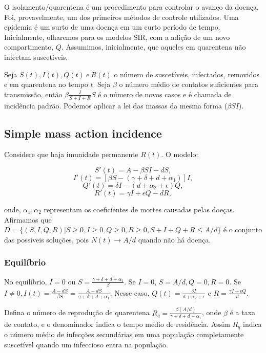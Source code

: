 O isolamento/quarentena é um procedimento para controlar o avanço da doença.
Foi, provavelmente, um dos primeiros métodos de controle utilizados. Uma
epidemia é um surto de uma doença em um curto período de tempo. Inicialmente,
olharemos para os modelos SIR, com a adição de um novo compartimento, $Q$.
Assumimos, inicialmente, que aqueles em quarentena não infectam suscetíveis. 

Seja $S(t), I(t), Q(t) ~e~ R(t) $ o número de suscetíveis, infectados,
removidos e em quarentena no tempo $t$. Seja $\beta$ o número médio de
contatos suficientes para transmissão,  então $\beta\frac{I}{S + I + R}S$ é o
número de novos casos e é chamada de incidência padrão. Podemos aplicar a
lei das massas da mesma forma ($\beta SI$). 

\subsection{Simple mass action incidence}

Considere que haja imunidade permanente $R(t)$. O modelo: 

$$ S'(t) = A - \beta SI - dS,$$
$$ I'(t) = [\beta S - (\gamma + \delta + d + \alpha_1)]I,$$
$$ Q'(t) = \delta I - (d + \alpha_2 + \epsilon)Q,$$
$$ R'(t) = \gamma I + \epsilon Q - dR, $$

onde, $\alpha_1, \alpha_2$ representam os coeficientes de mortes causadas
pelas doeças. Afirmamos que $D = \{(S,I,Q,R) | S \geq 0, I \geq 0, Q \geq 0, R
\geq 0, S + I + Q + R \leq A/d\}$ é o conjunto das possíveis soluções, pois
$N(t) \to A/d$ quando não há doença. 

\subsubsection{Equilíbrio}

No equilíbrio, $I = 0$ ou $S = \frac{\gamma + \delta + d + \alpha_1}{\beta}$.
Se $I = 0$, $S = A/d, Q = 0, R = 0$. Se $I \neq 0, I(t) = \frac{A - dS}{\beta
S} = \frac{A - dS}{\gamma + \delta + d + \alpha_1}$. Nesse caso, $Q(t) =
\frac{\delta I}{d + \alpha_2 + \epsilon}$ e $R = \frac{\gamma I + \epsilon
Q}{d}$. 

Defina o número de reprodução de quarentena $R_q = \frac{\beta(A/d)}{\gamma +
\delta + d + \alpha_1}$, onde $\beta$ é a taxa de contato, e o denominador
indica o tempo médio de residência. Assim $R_q$ indica o número médio de
infecções secundárias em uma população completamente suscetível quando um
infeccioso entra na população. 

